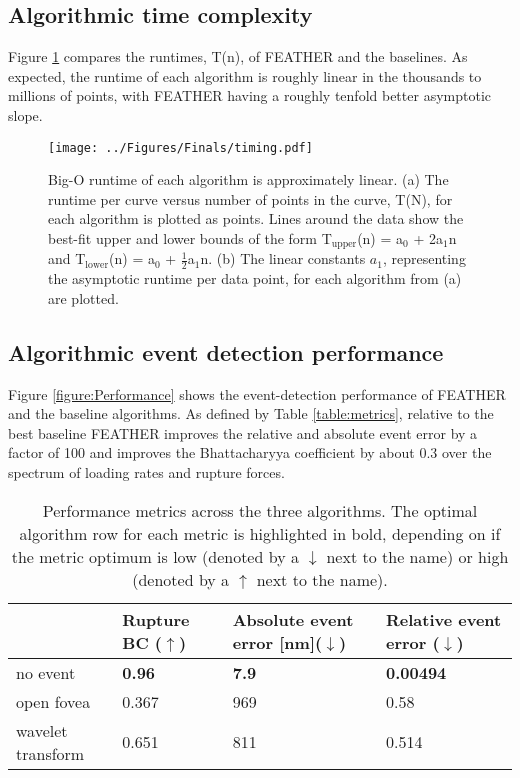 \documentclass[%
  aip,12pt,tightenlines,
  amsthm,
 amsmath,amssymb
]{article}
\newcommand{\e}[0]{\\ \hline}
\newcommand{\tRef}[1]{Table \ref{table:#1}}
\newcommand{\fRef}[1]{Figure \ref{figure:#1}}
\newcommand{\fLabel}[1]{\label{figure:#1}}
\newcommand{\tLabel}[1]{\label{table:#1}}
\newcommand{\sLabel}[1]{\label{section:#1}}
\newcommand{\firstp}[0]{}
\newcommand{\pl}[0]{\vspace{6pt}}
\newcommand{\pEndF}[0]{ \\ }
\newcommand{\pStartF}[0]{ }
\newcommand{\name}[0]{FEATHER}
\newcommand{\bc}[0]{Bhattacharyya}
\newcommand{\figwidth}[0]{\linewidth}
\begin{document}
\subsection{\sLabel{Timing}Algorithmic time complexity}

\firstp \fRef{Timing} compares the runtimes, T(n), of \name{} and the baselines. As expected, the runtime of each algorithm is roughly linear in the thousands to millions of points, with \name{} having a roughly tenfold better asymptotic slope.  \pl

\begin{figure}
\centering
\texttt{[image: ../Figures/Finals/timing.pdf]}%
\caption[Runtime versus length of curve]{\noindent\fLabel{Timing}\pStartF  Big-O runtime of each algorithm is approximately linear. (a) The runtime per curve versus number of points in the curve, T(N), for each algorithm is plotted as points. Lines around the data show the best-fit upper and lower bounds of the form T$_{\mathrm{upper}}$(n) = a$_0$ + 2a$_1$n  and T$_{\mathrm{lower}}$(n) = a$_0$ + $\frac{1}{2}$a$_1$n. (b) The linear constants $a_1$, representing the asymptotic runtime per data point, for each algorithm from (a) are plotted. \pEndF}
\end{figure}

\subsection{\sLabel{Performance}Algorithmic event detection performance}

\fRef{Performance} shows the event-detection performance of \name{} and the baseline algorithms. As defined by \tRef{metrics}, relative to the best baseline \name{} improves the relative and absolute event error by a factor of 100 and improves the \bc{} coefficient by about 0.3 over the spectrum of loading rates and rupture forces. 

\begin{table}
\begin{tabularx}{\textwidth}{ l || l | l | l }
\hline \hline
 & Rupture BC ($\uparrow$) & Absolute event error [nm]($\downarrow$) & Relative event error ($\downarrow$)\e\hline 
no event & \textbf{0.96} & \textbf{7.9} & \textbf{0.00494}\e
open fovea & 0.367 & 969 & 0.58\e
wavelet transform & 0.651 & 811 & 0.514\e
\end{tabularx}
\caption[Algorithm performance]{\tLabel{AppliedMetrics} Performance metrics across the three algorithms. The optimal algorithm row for each metric is highlighted in bold, depending on if the metric optimum is low (denoted by a $\downarrow$ next to the name) or high (denoted by a $\uparrow$ next to the name).} 
\end{table}
\end{document}
